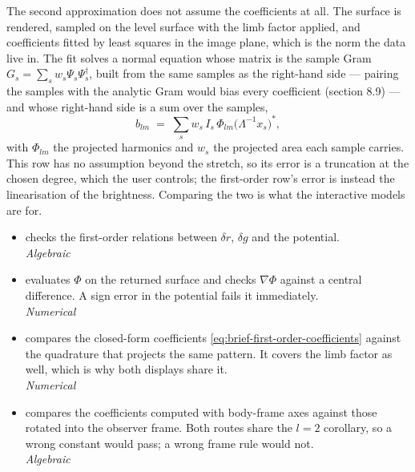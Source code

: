 The second approximation does not assume the coefficients at all.  The surface is rendered,
sampled on the level surface with the limb factor applied, and coefficients fitted by least
squares in the image plane, which is the norm the data live in.  The fit solves a normal
equation whose matrix is the sample Gram $G_s = \sum_s w_s \Psi_s\Psi_s^{\dagger}$, built from
the same samples as the right-hand side --- pairing the samples with the analytic Gram would
bias every coefficient (section 8.9) --- and whose right-hand side is a sum over the samples,
\begin{equation}
  b_{lm} \;=\; \sum_s w_s\, I_s\, \Phi_{lm}\bigl(\Lambda^{-1}x_s\bigr)^* ,
  \label{eq:brief-fitted-rhs}
\end{equation}
with $\Phi_{lm}$ the projected harmonics and $w_s$ the projected area each sample carries.
This row has no assumption beyond the stretch, so its error is a truncation at the chosen
degree, which the user controls; the first-order row's error is instead the linearisation of
the brightness.  Comparing the two is what the interactive models are for.




\begin{itemize}
  \item[$\checkmark$]  checks the first-order relations
    between $\delta r$, $\delta g$ and the potential.
    \\[1pt] \quad \emph{Algebraic}
  \item[$\checkmark$]  evaluates $\Phi$ on the returned surface and
    checks $\nabla\Phi$ against a central difference.  A sign error in the potential fails it
    immediately.
    \\[1pt] \quad \emph{Numerical}
\end{itemize}

\begin{itemize}
  \item[$\checkmark$]  compares the closed-form coefficients
    \eqref{eq:brief-first-order-coefficients} against the quadrature that projects the same
    pattern.  It covers the limb factor as well, which is why both displays share it.
    \\[1pt] \quad \emph{Numerical}
  \item[$\checkmark$]  compares the coefficients computed with
    body-frame axes against those rotated into the observer frame.  Both routes share the
    $l = 2$ corollary, so a wrong constant would pass; a wrong frame rule would not.
    \\[1pt] \quad \emph{Algebraic}
\end{itemize}

